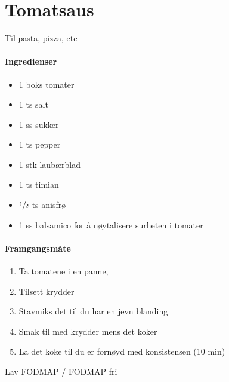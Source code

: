 \section{Tomatsaus}
Til pasta, pizza, etc

\paragraph{Ingredienser}
\begin{itemize}[noitemsep]
	\item 1 boks tomater
	\item 1 ts salt
	\item 1 ss sukker
	\item 1 ts pepper
	\item 1 stk laubærblad
	\item 1 ts timian
	\item $\sfrac{1}{2}$ ts anisfrø
	\item 1 ss balsamico for å nøytalisere surheten i tomater
\end{itemize}

\paragraph{Framgangsmåte}
\begin{enumerate}[noitemsep]
	\item Ta tomatene i en panne,
	\item Tilsett krydder
	\item Stavmiks det til du har en jevn blanding
	\item Smak til med krydder mens det koker
	\item La det koke til du er fornøyd med konsistensen (10 min)

\end{enumerate}

Lav FODMAP / FODMAP fri

